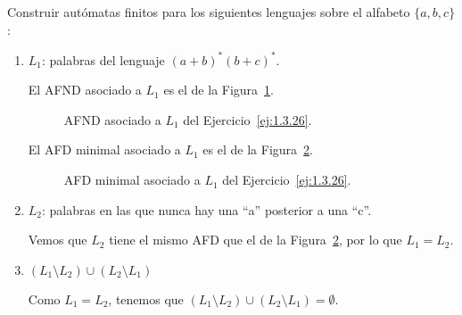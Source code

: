 \begin{ejercicio}\label{ej:1.3.26}
    Construir autómatas finitos para los siguientes lenguajes sobre el alfabeto $\{a,b,c\}$:
    \begin{enumerate}
        \item $L_1$: palabras del lenguaje ${(a+b)}^{\ast}{(b+c)}^{\ast}$.
        
        El AFND asociado a $L_1$ es el de la Figura~\ref{fig:1.3.26-L1-ND}.
        \begin{figure}[H]
            \centering
            \caption{AFND asociado a $L_1$ del Ejercicio~\ref{ej:1.3.26}.}
            \label{fig:1.3.26-L1-ND}
        \end{figure}

        El AFD minimal asociado a $L_1$ es el de la Figura~\ref{fig:1.3.26-L1}.
        \begin{figure}[H]
            \centering
            \caption{AFD minimal asociado a $L_1$ del Ejercicio~\ref{ej:1.3.26}.}
            \label{fig:1.3.26-L1}
        \end{figure}
        \item $L_2$: palabras en las que nunca hay una ``a'' posterior a una ``c''.
        
        Vemos que $L_2$ tiene el mismo AFD que el de la Figura~\ref{fig:1.3.26-L1}, por lo que $L_1=L_2$.

        \item $(L_1 \setminus L_2)\cup (L_2 \setminus L_1)$
        
        Como $L_1=L_2$, tenemos que $(L_1 \setminus L_2)\cup (L_2 \setminus L_1)=\emptyset$.
    \end{enumerate}
\end{ejercicio}

